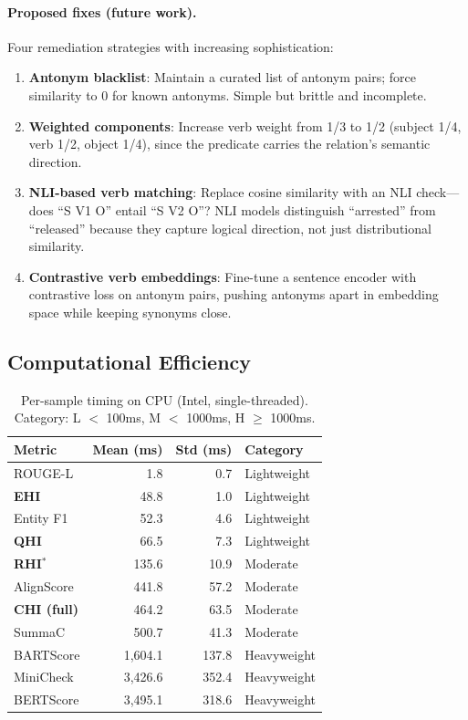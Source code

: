 \documentclass[11pt]{article}
\begin{document}
\paragraph{Proposed fixes (future work).} Four remediation strategies with increasing sophistication:
\begin{enumerate}
\item \textbf{Antonym blacklist}: Maintain a curated list of antonym pairs; force similarity to 0 for known antonyms. Simple but brittle and incomplete.
\item \textbf{Weighted components}: Increase verb weight from 1/3 to 1/2 (subject 1/4, verb 1/2, object 1/4), since the predicate carries the relation's semantic direction.
\item \textbf{NLI-based verb matching}: Replace cosine similarity with an NLI check---does ``S V1 O'' entail ``S V2 O''? NLI models distinguish ``arrested'' from ``released'' because they capture logical direction, not just distributional similarity.
\item \textbf{Contrastive verb embeddings}: Fine-tune a sentence encoder with contrastive loss on antonym pairs, pushing antonyms apart in embedding space while keeping synonyms close.
\end{enumerate}


\subsection{Computational Efficiency}

\begin{table}[h]
\centering
\caption{Per-sample timing on CPU (Intel, single-threaded). Category: L $<$ 100ms, M $<$ 1000ms, H $\geq$ 1000ms.}
\label{tab:efficiency}
\begin{tabular}{lrrl}
\toprule
\textbf{Metric} & \textbf{Mean (ms)} & \textbf{Std (ms)} & \textbf{Category} \\
\midrule
ROUGE-L & 1.8 & 0.7 & Lightweight \\
\textbf{EHI} & 48.8 & 1.0 & Lightweight \\
Entity F1 & 52.3 & 4.6 & Lightweight \\
\textbf{QHI} & 66.5 & 7.3 & Lightweight \\
\textbf{RHI$^*$} & 135.6 & 10.9 & Moderate \\
AlignScore & 441.8 & 57.2 & Moderate \\
\textbf{CHI (full)} & 464.2 & 63.5 & Moderate \\
SummaC & 500.7 & 41.3 & Moderate \\
BARTScore & 1,604.1 & 137.8 & Heavyweight \\
MiniCheck & 3,426.6 & 352.4 & Heavyweight \\
BERTScore & 3,495.1 & 318.6 & Heavyweight \\
\bottomrule
\end{tabular}
\end{table}
\end{document}
